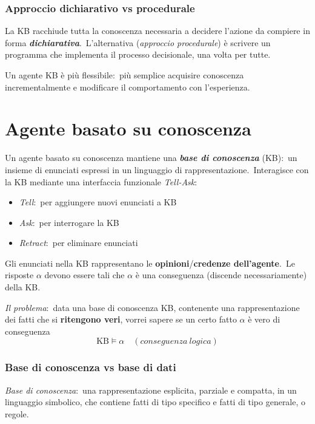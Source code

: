 \subsubsection{Approccio dichiarativo vs procedurale}

La KB racchiude tutta la conoscenza necessaria a decidere l'azione da compiere in forma \textbf{\textit{dichiarativa}}.\
L'alternativa (\textit{approccio procedurale}) è scrivere un programma che implementa il processo decisionale, una volta per tutte.

Un agente KB è più flessibile:\ più semplice acquisire conoscenza incrementalmente e modificare il comportamento con l'esperienza.

\section{Agente basato su conoscenza}

Un agente basato su conoscenza mantiene una \textbf{\textit{base di conoscenza}} (KB):\ un insieme di enunciati espressi in un linguaggio di rappresentazione.\
Interagisce con la KB mediante una interfaccia funzionale \textit{Tell-Ask}:
\begin{itemize}
	\item \textit{Tell}:\ per aggiungere nuovi enunciati a KB
	\item \textit{Ask}:\ per interrogare la KB
	\item \textit{Retract}:\ per eliminare enunciati
\end{itemize}
Gli enunciati nella KB rappresentano le \textbf{opinioni}{\slash}\textbf{credenze dell'agente}.\
Le risposte $\alpha$ devono essere tali che $\alpha$ è una conseguenza (discende necessariamente) della KB.\

\textit{Il problema}:\ data una base di conoscenza KB, contenente una rappresentazione dei fatti che si \textbf{ritengono veri}, vorrei sapere se un certo fatto $\alpha$ è vero di conseguenza
\[\mathrm{KB} \models \alpha\quad (\mathit{conseguenza\ logica})\]

\subsubsection{Base di conoscenza vs base di dati}

\textit{Base di conoscenza}:\ una rappresentazione esplicita, parziale e compatta, in un linguaggio simbolico, che contiene fatti di tipo specifico e fatti di tipo generale, o regole.\


